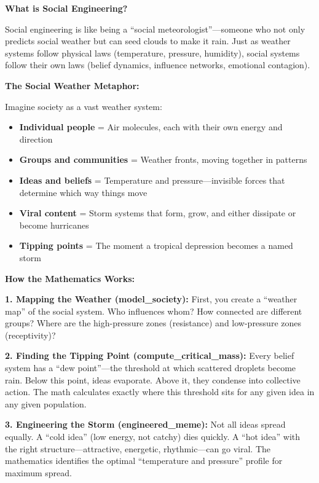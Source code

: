 \begin{tcolorbox}[colback=green!5!white,colframe=green!65!black,title=\textbf{Plain English: The Social Weather System},breakable]

\textbf{What is Social Engineering?}

Social engineering is like being a ``social meteorologist''---someone who not only predicts social weather but can seed clouds to make it rain. Just as weather systems follow physical laws (temperature, pressure, humidity), social systems follow their own laws (belief dynamics, influence networks, emotional contagion).

\textbf{The Social Weather Metaphor:}

Imagine society as a vast weather system:
\begin{itemize}
    \item \textbf{Individual people} = Air molecules, each with their own energy and direction
    \item \textbf{Groups and communities} = Weather fronts, moving together in patterns
    \item \textbf{Ideas and beliefs} = Temperature and pressure---invisible forces that determine which way things move
    \item \textbf{Viral content} = Storm systems that form, grow, and either dissipate or become hurricanes
    \item \textbf{Tipping points} = The moment a tropical depression becomes a named storm
\end{itemize}

\textbf{How the Mathematics Works:}

\textbf{1. Mapping the Weather (model\_society):}
First, you create a ``weather map'' of the social system. Who influences whom? How connected are different groups? Where are the high-pressure zones (resistance) and low-pressure zones (receptivity)?

\textbf{2. Finding the Tipping Point (compute\_critical\_mass):}
Every belief system has a ``dew point''---the threshold at which scattered droplets become rain. Below this point, ideas evaporate. Above it, they condense into collective action. The math calculates exactly where this threshold sits for any given idea in any given population.

\textbf{3. Engineering the Storm (engineered\_meme):}
Not all ideas spread equally. A ``cold idea'' (low energy, not catchy) dies quickly. A ``hot idea'' with the right structure---attractive, energetic, rhythmic---can go viral. The mathematics identifies the optimal ``temperature and pressure'' profile for maximum spread.


\end{tcolorbox}
